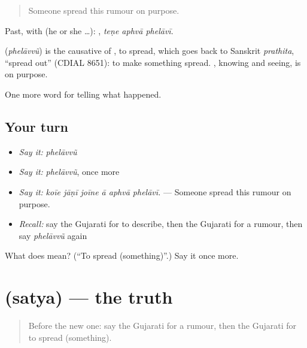 \begin{quote}
Someone spread this rumour on purpose.
\end{quote}

Past, with  (he or she …):   , \emph{teṇe aphvā phelāvī}.

\begin{cousinweb}
\textbf{} (\emph{phelāvvũ}) is the causative of \textbf{}, to spread, which goes back to Sanskrit \emph{prathita}, \textquotedblleft{}spread out\textquotedblright{} (CDIAL 8651): to make something spread. \textbf{ }, knowing and seeing, is on purpose.
\end{cousinweb}

\begin{grammarlens}[title={What you've built}]
One more word for telling what happened.
\end{grammarlens}

\subsection*{Your turn}
\begin{itemize}
\raggedright
  \item \emph{Say it:} \emph{phelāvvũ}
  \item \emph{Say it:} \emph{phelāvvũ}, once more
  \item \emph{Say it:} \emph{koīe jāṇī joīne ā aphvā phelāvī.} — Someone spread this rumour on purpose.
  \item \emph{Recall:} say the Gujarati for to describe, then the Gujarati for a rumour, then say \emph{phelāvvũ} again
\end{itemize}

\begin{tcolorbox}[breakable,colback=teal!4,colframe=teal!35!black,title={Before you move on}]
What does  mean? (\textquotedblleft{}To spread (something)\textquotedblright{}.) Say it once more.
\end{tcolorbox}
\section[\texorpdfstring{\gu{સત્ય} (satya)}{સત્ય (satya)}]{ (satya) — the truth}

\label{lesson:GU-C313-satya}



\begin{quote}
Before the new one: say the Gujarati for a rumour, then the Gujarati for to spread (something).
\end{quote}

